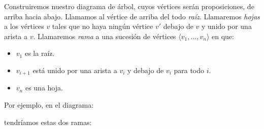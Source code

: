 Construiremos nuestro diagrama de árbol, cuyos vértices serán proposiciones, de arriba hacia abajo. Llamamos al vértice de arriba del todo \textit{raíz}. Llamaremos \textit{hojas} a los vértices $v$ tales que no haya ningún vértice $v'$ debajo de $v$ y unido por una arista a $v$. Llamaremos \textit{rama} a una sucesión de vértices 
$\langle v_1, \dots, v_n\rangle$ en que:
\begin{itemize}
    \item $v_1$ es la raíz.
    \item $v_{i+1}$ está unido por una arista a $v_i$ y debajo de $v_i$ para todo $i$.
    \item $v_n$ es una hoja.
\end{itemize}
 Por ejemplo, en el diagrama:
\begin{center}
\end{center}
tendríamos estas dos ramas:
\begin{center}
\end{center}





